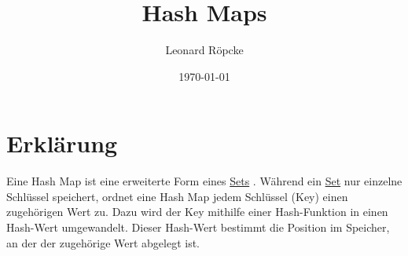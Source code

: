 \documentclass[12pt,a4paper]{article}
\title{Hash Maps}
\author{Leonard Röpcke}
\date{\today}
\begin{document}
\maketitle

\section*{Erklärung}
Eine Hash Map ist eine erweiterte Form eines 
\href{https://leonard-roepcke.github.io/Knowledge-Archive/knowledge/informatics/data_structure/set/set.pdf}{Sets}
. Während ein 
\href{https://leonard-roepcke.github.io/Knowledge-Archive/knowledge/informatics/data_structure/set/set.pdf}{Set}
 nur einzelne Schlüssel speichert, ordnet eine Hash Map jedem Schlüssel (Key) einen zugehörigen 
 Wert zu. Dazu wird der Key mithilfe einer Hash-Funktion in einen Hash-Wert umgewandelt. 
 Dieser Hash-Wert bestimmt die Position im Speicher, an der der zugehörige Wert abgelegt ist.
\end{document}
